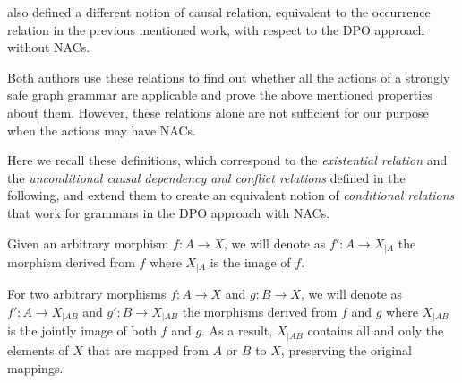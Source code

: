 \cite{Corradini1996} also defined a different notion of causal relation, equivalent to the occurrence relation in the previous mentioned work, with respect to the DPO approach without NACs.

Both authors use these relations to find out whether all the actions of a strongly safe graph grammar are applicable and prove the above mentioned properties about them. However, these relations alone are not sufficient for our purpose when the actions may have NACs.

Here we recall these definitions, which correspond to the \emph{existential relation} and the \emph{unconditional causal dependency and conflict relations} defined in the following, and extend them to create an equivalent notion of \emph{conditional relations} that work for grammars in the DPO approach with NACs.

\begin{notation} Given an arbitrary morphism $f : A \rightarrow X$, we will denote as $f' : A \rightarrow X_{|A}$ the morphism derived from $f$ where $X_{|A}$ is the image of $f$.

  For two arbitrary morphisms $f : A \rightarrow X$ and $g : B \rightarrow X$, we will denote as $f' : A \rightarrow X_{|AB}$ and $g' : B \rightarrow X_{|AB}$ the morphisms derived from $f$ and $g$ where $X_{|AB}$ is the jointly image of both $f$ and $g$. As a result, $X_{|AB}$ contains all and only the elements of $X$ that are mapped from $A$ or $B$ to $X$, preserving the original mappings.
\end{notation}

